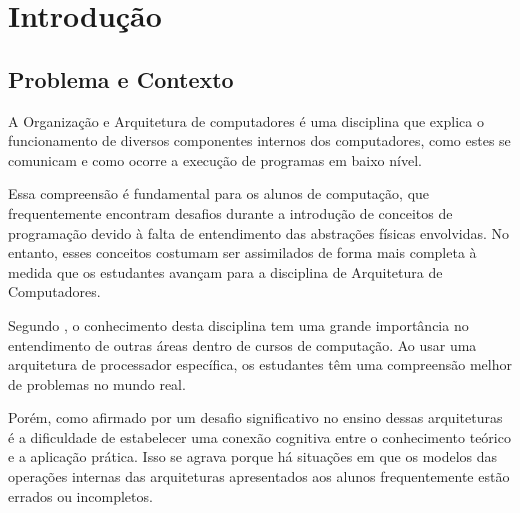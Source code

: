 \documentclass[
	12pt,				%
	openright,			%
	oneside,			%
	a4paper,			%
	english,			%
	french,				%
	spanish,			%
	brazil,				%
	]{abntex2}
\begin{document}

\tableofcontents*
\cleardoublepage


\textual


\chapter{Introdução}
\section{Problema e Contexto}
A Organização e Arquitetura de computadores é uma disciplina que explica o funcionamento de diversos componentes internos dos computadores, como estes se comunicam e como ocorre a execução de programas em baixo nível.\cite{soares_simuladores_2015}\cite[p.12]{favero_organizacao_2011}\cite{lourenco_ensino_2005}

Essa compreensão é fundamental para os alunos de computação, que frequentemente encontram desafios durante a introdução de conceitos de programação devido à falta de entendimento das abstrações físicas envolvidas. No entanto, esses conceitos costumam ser assimilados de forma mais completa à medida que os estudantes avançam para a disciplina de Arquitetura de Computadores.\cite{raabe_processadores_2006}

Segundo , o conhecimento desta disciplina tem  uma grande importância no entendimento de outras áreas dentro de cursos de computação. Ao usar uma arquitetura de processador específica, os estudantes têm uma compreensão melhor de problemas no mundo real. 

Porém, como afirmado por  um desafio significativo no ensino dessas arquiteturas é a dificuldade de estabelecer uma conexão cognitiva entre o conhecimento teórico e a aplicação prática. Isso se agrava porque há situações em que os modelos das operações internas das arquiteturas apresentados aos alunos frequentemente estão errados ou incompletos.\cite[p.60]{yehezkel_three_2001}
\end{document}
